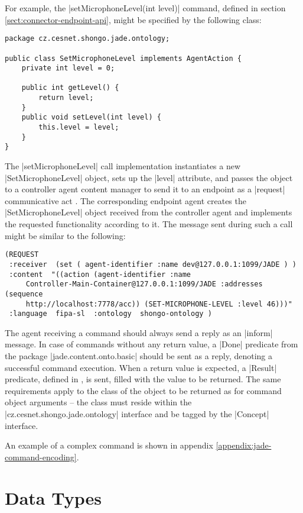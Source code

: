 \documentclass[a4paper]{report}
\begin{document}
For example, the |setMicrophoneLevel(int level)| command, defined in section \ref{sect:connector-endpoint-api}, might be specified by the following class:
\begin{verbatim}
package cz.cesnet.shongo.jade.ontology;

public class SetMicrophoneLevel implements AgentAction {
    private int level = 0;

    public int getLevel() {
        return level;
    }
    public void setLevel(int level) {
        this.level = level;
    }
}
\end{verbatim}
The |setMicrophoneLevel| call implementation instantiates a new |SetMicrophoneLevel| object, sets up the |level| attribute, and passes the object to a controller agent content manager to send it to an endpoint as a |request| communicative act \cite{FIPA-ComActSpec}. The corresponding endpoint agent creates the |SetMicrophoneLevel| object received from the controller agent and implements the requested functionality according to it. The message sent during such a call might be similar to the following:
\begin{verbatim}
(REQUEST
 :receiver  (set ( agent-identifier :name dev@127.0.0.1:1099/JADE ) )
 :content  "((action (agent-identifier :name
     Controller-Main-Container@127.0.0.1:1099/JADE :addresses (sequence
     http://localhost:7778/acc)) (SET-MICROPHONE-LEVEL :level 46)))"
 :language  fipa-sl  :ontology  shongo-ontology )
\end{verbatim}

The agent receiving a command should always send a reply as an |inform| \cite{FIPA-ComActSpec} message. In case of commands without any return value, a |Done| predicate from the package |jade.content.onto.basic| should be sent as a reply, denoting a successful command execution. When a return value is expected, a |Result| predicate, defined in \cite{FIPA-SL}, is sent, filled with the value to be returned. The same requirements apply to the class of the object to be returned as for command object arguments -- the class must reside within the |cz.cesnet.shongo.jade.ontology| interface and be tagged by the |Concept| interface.

An example of a complex command is shown in appendix \ref{appendix:jade-command-encoding}.




\section{Data Types}
\end{document}
